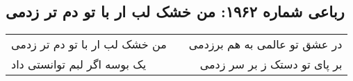\begin{center}
\section*{رباعی شماره ۱۹۶۲: من خشک لب ار با تو دم تر زدمی}
\label{sec:1962}
\begin{longtable}{l p{0.5cm} r}
من خشک لب ار با تو دم تر زدمی
&&
در عشق تو عالمی به هم برزدمی
\\
یک بوسه اگر لبم توانستی داد
&&
بر پای تو دستک ز بر سر زدمی
\\
\end{longtable}
\end{center}
